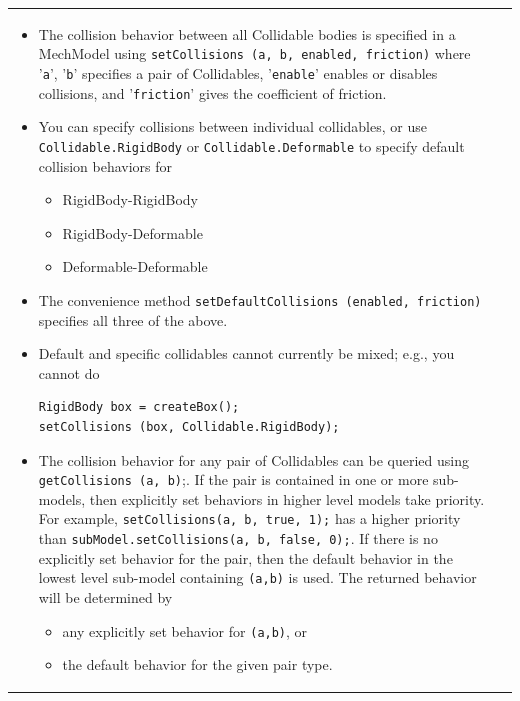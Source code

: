 \documentclass{article}
\begin{document}
\begin{tabular}{ll}
\begin{itemize}

\item The collision behavior between all Collidable bodies is specified 
in a MechModel using {\tt setCollisions (a, b, enabled, friction)} where
'{\tt a}', '{\tt b}' specifies a pair of Collidables, '{\tt enable}' enables 
or disables collisions, and '{\tt friction}' gives the coefficient of 
friction.

\item You can specify collisions between individual collidables, or use 
{\tt Collidable.RigidBody} or {\tt Collidable.Deformable} to specify default
collision behaviors for 

\begin{itemize}

\item RigidBody-RigidBody

\item RigidBody-Deformable

\item Deformable-Deformable

\end{itemize}

\item The convenience method {\tt setDefaultCollisions (enabled, friction)} 
specifies all three of the above. 

\item Default and specific collidables cannot currently be mixed; e.g., 
you cannot do 
\begin{lstlisting}[]
RigidBody box = createBox();
setCollisions (box, Collidable.RigidBody);
\end{lstlisting}

\item The collision behavior for any pair of Collidables can be queried
using {\tt getCollisions (a, b)};. If the pair is contained in one or more 
sub-models, then explicitly set behaviors in higher level models take 
priority. For example, {\tt setCollisions(a, b, true, 1);} has a higher 
priority than {\tt subModel.setCollisions(a, b, false, 0);}. If there is
no explicitly set behavior for the pair, then the default behavior in 
the lowest level sub-model containing {\tt (a,b)} is used. The returned 
behavior will be determined by

\begin{itemize}

\item any explicitly set behavior for {\tt (a,b)}, or
\item the default behavior for the given pair type. 


\end{itemize}
\end{itemize}
\end{tabular}
\end{document}
